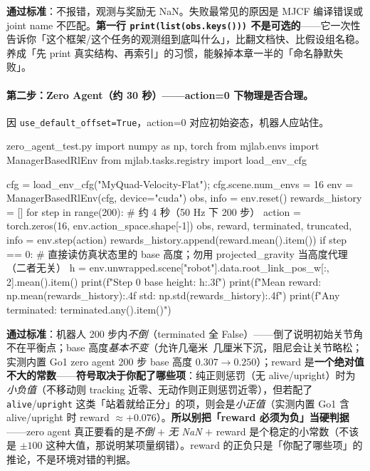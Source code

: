 \textbf{通过标准}：不报错，观测与奖励无 NaN。失败最常见的原因是 MJCF 编译错误或 joint name 不匹配。\textbf{第一行 \texttt{print(list(obs.keys()))} 不是可选的}——它一次性告诉你「这个框架/这个任务的观测组到底叫什么」，比翻文档快、比假设组名稳。养成「先 print 真实结构、再索引」的习惯，能躲掉本章一半的「命名静默失败」。

\paragraph{第二步：Zero Agent（约 30 秒）——action=0 下物理是否合理。}因 \verb|use_default_offset=True|，action=0 对应初始姿态，机器人应站住。

\begin{codebox}[Python]{zero\_agent\_test.py}
import numpy as np, torch
from mjlab.envs import ManagerBasedRlEnv
from mjlab.tasks.registry import load_env_cfg

cfg = load_env_cfg("MyQuad-Velocity-Flat"); cfg.scene.num_envs = 16
env = ManagerBasedRlEnv(cfg, device="cuda")
obs, info = env.reset()
rewards_history = []
for step in range(200):                       # 约 4 秒（50 Hz 下 200 步）
    action = torch.zeros(16, env.action_space.shape[-1])
    obs, reward, terminated, truncated, info = env.step(action)
    rewards_history.append(reward.mean().item())
    if step == 0:
        # 直接读仿真状态里的 base 高度；勿用 projected_gravity 当高度代理（二者无关）
        h = env.unwrapped.scene["robot"].data.root_link_pos_w[:, 2].mean().item()
        print(f"Step 0 base height: {h:.3f}")
print(f"Mean reward: {np.mean(rewards_history):.4f}  std: {np.std(rewards_history):.4f}")
print(f"Any terminated: {terminated.any().item()}")
\end{codebox}

\textbf{通过标准}：机器人 200 步内\emph{不倒}（terminated 全 False）——倒了说明初始关节角不在平衡点；base 高度\emph{基本不变}（允许几毫米~几厘米下沉，阻尼会让关节略松；实测内置 Go1 zero agent 200 步 base 高度 $0.307\to 0.250$）；reward 是\textbf{一个绝对值不大的常数}——\textbf{符号取决于你配了哪些项}：纯正则惩罚（无 alive/upright）时为\emph{小负值}（不移动则 tracking 近零、无动作则正则惩罚近零），但若配了 \verb|alive|/\verb|upright| 这类「站着就给正分」的项，则会是\emph{小正值}（实测内置 Go1 含 alive/upright 时 reward $\approx +0.076$）。\textbf{所以别把「reward 必须为负」当硬判据}——zero agent 真正要看的是\emph{不倒} $+$ \emph{无 NaN} $+$ reward 是个稳定的小常数（不该是 $\pm 100$ 这种大值，那说明某项量纲错）。reward 的正负只是「你配了哪些项」的推论，不是环境对错的判据。


